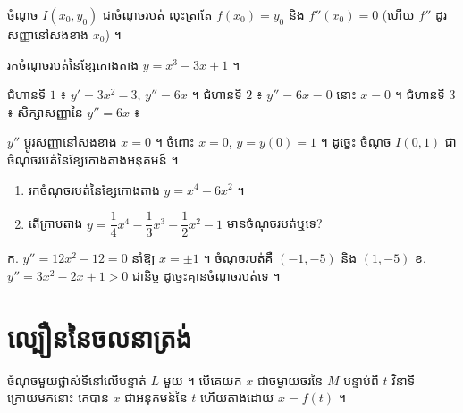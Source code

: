 \begin{note}[សម្គាល់]
ចំណុច $I(x_0, y_0)$ ជាចំណុចរបត់ លុះត្រាតែ $f(x_0) = y_0$ និង $f''(x_0) = 0$ (ហើយ $f''$ ដូរសញ្ញានៅសងខាង $x_0$) ។
\end{note}

\begin{example}[លំហាត់គំរូ]
រកចំណុចរបត់នៃខ្សែកោងតាង $y = x^3 - 3x + 1$ ។
\end{example}
\ans
ជំហានទី $1$ ៖ $y' = 3x^2 - 3$, $y'' = 6x$ ។ ជំហានទី $2$ ៖ $y'' = 6x = 0$ នោះ $x = 0$ ។ ជំហានទី $3$ ៖ សិក្សាសញ្ញានៃ $y'' = 6x$ ៖
\begin{center}
\end{center}
$y''$ ប្ដូរសញ្ញានៅសងខាង $x = 0$ ។ ចំពោះ $x = 0$, $y = y(0) = 1$ ។ ដូច្នេះ ចំណុច $I(0, 1)$ ជាចំណុចរបត់នៃខ្សែកោងតាងអនុគមន៍ ។

\begin{pro}
\begin{enumerate}[a]
  \item រកចំណុចរបត់នៃខ្សែកោងតាង $y = x^4 - 6x^2$ ។
  \item តើក្រាបតាង $y = \dfrac{1}{4}x^4 - \dfrac{1}{3}x^3 + \dfrac{1}{2}x^2 - 1$ មានចំណុចរបត់ឬទេ?
\end{enumerate}
\ans
ក. $y'' = 12x^2 - 12 = 0$ នាំឱ្យ $x = \pm 1$ ។ ចំណុចរបត់គឺ $(-1, -5)$ និង $(1, -5)$ \quad ខ. $y'' = 3x^2 - 2x + 1 > 0$ ជានិច្ច ដូច្នេះគ្មានចំណុចរបត់ទេ ។
\end{pro}

\section{ល្បឿននៃចលនាត្រង់}

ចំណុចមួយផ្លាស់ទីនៅលើបន្ទាត់ $L$ មួយ ។ បើគេយក $x$ ជាចម្ងាយចរនៃ $M$ បន្ទាប់ពី $t$ វិនាទី ក្រោយមកនោះ គេបាន $x$ ជាអនុគមន៍នៃ $t$ ហើយតាងដោយ $x = f(t)$ ។

\begin{center}
\end{center}

